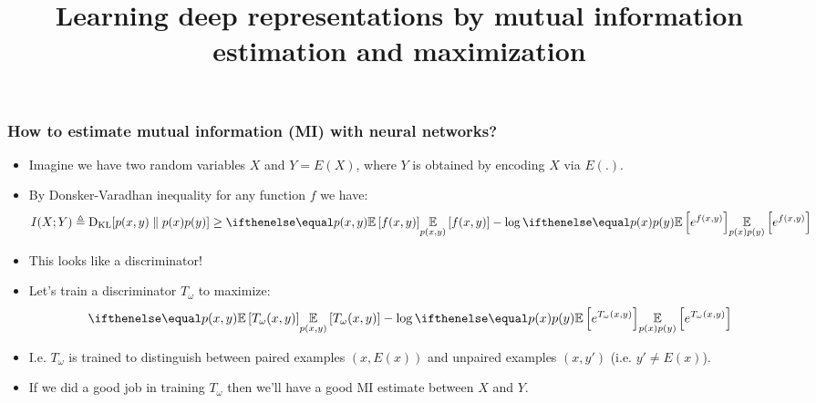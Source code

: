\documentclass[10pt]{beamer}
\title{Learning deep representations by mutual information estimation and maximization}
\begin{document}
\begin{frame}
    \titlepage
\end{frame}

%
%

\begin{frame}
\frametitle{How to estimate mutual information (MI) with neural networks?}

\begin{itemize}
    \item\pause Imagine we have two random variables $X$ and $Y = E(X)$, where $Y$ is obtained by encoding $X$ via $E(.)$.
    \item\pause By Donsker-Varadhan inequality for any function $f$ we have:
\begin{equation*}
I(X; Y) \triangleq \kl{p(x,y)}{p(x)p(y)} \geq \expect[p(x,y)]{f(x,y)} - \log \expect[p(x)p(y)]{e^{f(x,y)}}
\end{equation*}

    \item\pause This looks like a discriminator!
    \item\pause Let's train a discriminator $T_\omega$ to maximize:
\begin{equation*}
\expect[p(x,y)]{T_\omega(x,y)} - \log \expect[p(x)p(y)]{e^{T_\omega(x,y)}}
\end{equation*}
    \item\pause I.e. $T_\omega$ is trained to distinguish between paired examples $(x, E(x))$ and unpaired examples $(x, y')$ (i.e. $y' \neq E(x)$).
    \item\pause If we did a good job in training $T_\omega$ then we'll have a good MI estimate between $X$ and $Y$.
\end{itemize}

\end{frame}
\end{document}
